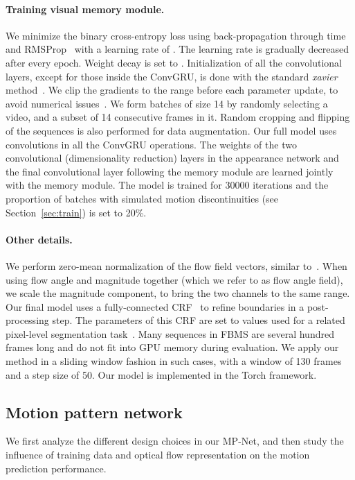 \paragraph{Training visual memory module.} We minimize the binary cross-entropy
loss using back-propagation through time and RMSProp~\cite{rmsprop} with a
learning rate of . The learning rate is gradually decreased after
every epoch. Weight decay is set to . Initialization of all the
convolutional layers, except for those inside the ConvGRU, is done with the
standard \textit{xavier} method~\cite{glorot2010understanding}. We clip the
gradients to the  range before each parameter update, to avoid
numerical issues~\cite{graves2013generating}. We form batches of size 14 by
randomly selecting a video, and a subset of 14 consecutive frames in it. Random
cropping and flipping of the sequences is also performed for data augmentation.
Our full model uses  convolutions in all the ConvGRU operations.
The weights of the two  convolutional (dimensionality reduction)
layers in the appearance network and the final  convolutional layer
following the memory module are learned jointly with the memory module.  The
model is trained for 30000 iterations and the proportion of batches with
simulated motion discontinuities (see Section~\ref{sec:train}) is set to 20\%.

\paragraph{Other details.} We perform zero-mean normalization of the flow field
vectors, similar to~\cite{simonyan2014two}. When using flow angle and magnitude
together (which we refer to as flow angle field), we scale the magnitude
component, to bring the two channels to the same range.  Our final model uses a
fully-connected CRF~\cite{krahenbuhl2011efficient} to refine boundaries in a
post-processing step. The parameters of this CRF are set to values used for a
related pixel-level segmentation task~\cite{chen2014semantic}. Many sequences
in FBMS are several hundred frames long and do not fit into GPU memory during
evaluation. We apply our method in a sliding window fashion in such cases, with
a window of 130 frames and a step size of 50. Our model is implemented in the
Torch framework.

\subsection{Motion pattern network}
\label{sec:mpnetexp}
We first analyze the different design choices in our MP-Net, and then study
the influence of training data and optical flow representation on the motion
prediction performance.

